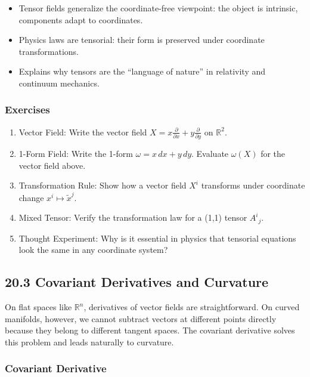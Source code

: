 \documentclass[
  letterpaper,
  DIV=11,
  numbers=noendperiod]{scrreprt}
\providecommand{\tightlist}{%
  \setlength{\itemsep}{0pt}\setlength{\parskip}{0pt}}
\begin{document}
\begin{itemize}
\tightlist
\item
  Tensor fields generalize the coordinate-free viewpoint: the object is
  intrinsic, components adapt to coordinates.
\item
  Physics laws are tensorial: their form is preserved under coordinate
  transformations.
\item
  Explains why tensors are the ``language of nature'' in relativity and
  continuum mechanics.
\end{itemize}

\subsubsection{Exercises}\label{exercises-70}

\begin{enumerate}
\def\labelenumi{\arabic{enumi}.}
\item
  Vector Field: Write the vector field
  \(X = x \frac{\partial}{\partial x} + y \frac{\partial}{\partial y}\)
  on \(\mathbb{R}^2\).
\item
  1-Form Field: Write the 1-form \(\omega = x \, dx + y \, dy\).
  Evaluate \(\omega(X)\) for the vector field above.
\item
  Transformation Rule: Show how a vector field \(X^i\) transforms under
  coordinate change \(x^i \mapsto \tilde{x}^j\).
\item
  Mixed Tensor: Verify the transformation law for a (1,1) tensor
  \(A^i{}_j\).
\item
  Thought Experiment: Why is it essential in physics that tensorial
  equations look the same in any coordinate system?
\end{enumerate}

\subsection{20.3 Covariant Derivatives and
Curvature}\label{covariant-derivatives-and-curvature}

On flat spaces like \(\mathbb{R}^n\), derivatives of vector fields are
straightforward. On curved manifolds, however, we cannot subtract
vectors at different points directly because they belong to different
tangent spaces. The covariant derivative solves this problem and leads
naturally to curvature.

\subsubsection{Covariant Derivative}\label{covariant-derivative}
\end{document}
